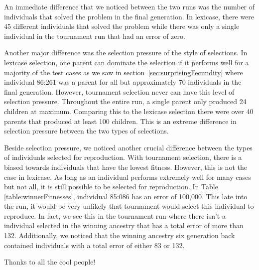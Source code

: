 An immediate difference that we noticed between the two runs was the number of individuals that solved the problem in the final generation. In lexicase, there were 45 different individuals that solved the problem while there was only a single individual in the tournament run that had an error of zero. 

Another major difference was the selection pressure of the style of selections. In lexicase selection, one parent can dominate the selection if it performs well for a majority of the test cases as we saw in section~\ref{sec:surprisingFecundity} where individual 86:261 was a parent for all but  approximately 70 individuals in the final generation. However, tournament selection never can have this level of selection pressure. Throughout the entire run, a single parent only produced 24 children at maximum. Comparing this to the lexicase selection there were over 40 parents that produced at least 100 children. This is an extreme difference in selection pressure between the two types of selections. 

Beside selection pressure, we noticed another crucial difference between the types of individuals selected for reproduction. With tournament selection, there is a biased towards individuals that have the lowest fitness. However, this is not the case in lexicase.  As long as an individual performs extremely well for many cases but not all, it is still possible to be selected for reproduction. In Table~ \ref{table:winnerFitnesses}, individual 85:086 has an error of 100,000. This late into the run, it would be very unlikely that tournament would select this individual to reproduce. In fact, we see this in the tournament run where there isn't a individual selected in the winning ancestry that has a total error of more than 132. Additionally, we noticed that the winning ancestry six generation back contained individuals with a total error of either 83 or 132. 

\begin{acknowledgement}
	Thanks to all the cool people!
\end{acknowledgement}



